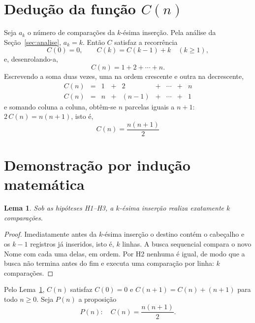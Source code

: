 \documentclass[11pt,a4paper]{article}
\newtheorem{lema}{Lema}
\begin{document}
\section{Dedução da função $C(n)$}
\label{sec:deducao}

Seja $a_k$ o número de comparações da $k$-ésima inserção. Pela análise da
Seção~\ref{sec:analise}, $a_k=k$. Então $C$ satisfaz a recorrência
\[
  C(0)=0, \qquad C(k)=C(k-1)+k \quad (k\ge 1),
\]
e, desenrolando-a,
\[
  C(n)=1+2+\cdots+n .
\]
Escrevendo a soma duas vezes, uma na ordem crescente e outra na decrescente,
\[
  \begin{array}{rcccccccc}
    C(n) &=& 1 &+& 2 &+& \cdots &+& n\\
    C(n) &=& n &+& (n-1) &+& \cdots &+& 1
  \end{array}
\]
e somando coluna a coluna, obtêm-se $n$ parcelas iguais a $n+1$:
$2\,C(n)=n(n+1)$, isto é,
\[
  \boxed{\,C(n)=\frac{n(n+1)}{2}\,}
\]

\section{Demonstração por indução matemática}
\label{sec:inducao}

\begin{lema}
\label{lema:custo}
Sob as hipóteses H1--H3, a $k$-ésima inserção realiza exatamente $k$ comparações.
\end{lema}
\begin{proof}
Imediatamente antes da $k$-ésima inserção o destino contém o cabeçalho e os $k-1$
registros já inseridos, isto é, $k$ linhas. A busca sequencial compara o novo Nome
com cada uma delas, em ordem. Por H2 nenhuma é igual, de modo que a busca não
termina antes do fim e executa uma comparação por linha: $k$ comparações.
\end{proof}

Pelo Lema~\ref{lema:custo}, $C(n)$ satisfaz $C(0)=0$ e $C(n+1)=C(n)+(n+1)$ para
todo $n\ge 0$. Seja $P(n)$ a proposição
\[
  P(n):\quad C(n)=\frac{n(n+1)}{2}.
\]
\end{document}
